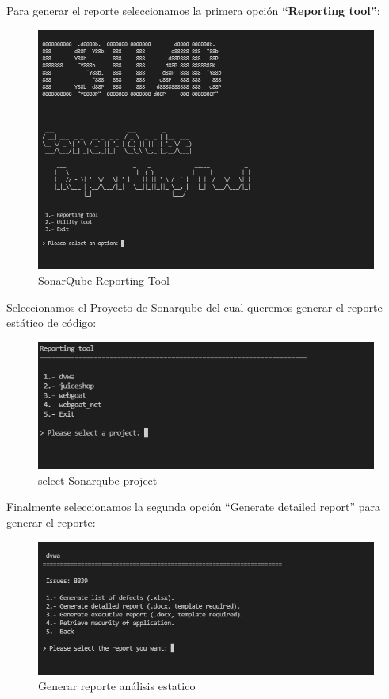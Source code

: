 Para generar el reporte seleccionamos la primera opción \textbf{“Reporting tool”}:
\begin{figure}[h!]  
    \includegraphics[width=\linewidth]{./imagenes/017_SonarQubeReportTool_1.png}
    \caption{SonarQube Reporting Tool}  
    \label{fig:15 - SonarQube Reporting tool}
\end{figure}

Seleccionamos el Proyecto de Sonarqube del cual queremos generar el reporte estático de código:
\begin{figure}[h!]  
    \includegraphics[width=\linewidth]{./imagenes/017_SonarQubeReportTool_2.png}
    \caption{select Sonarqube project}  
    \label{fig:16}
\end{figure}

Finalmente seleccionamos la segunda opción “Generate detailed report” para generar el reporte:

\begin{figure}[h!]  
    \includegraphics[width=\linewidth]{./imagenes/017_SonarQubeReportTool_3.png}
    \caption{Generar reporte análisis estatico}  
    \label{fig:17}
\end{figure}

